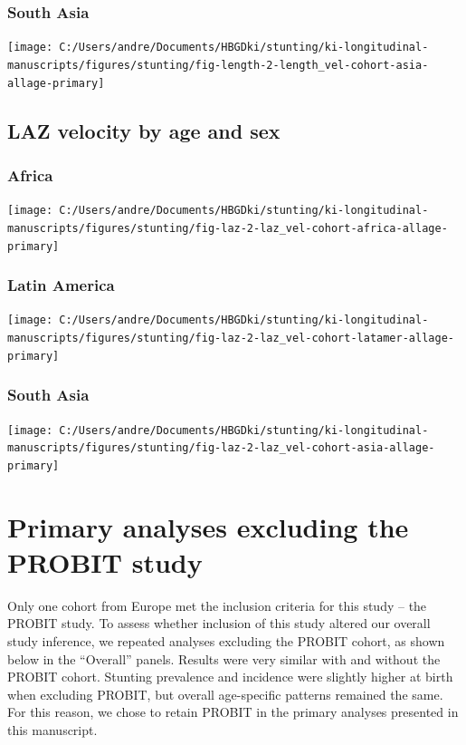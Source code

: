 \documentclass[9pt,]{book}
\begin{document}
\subsection{South Asia}\label{south-asia-3}

\texttt{[image: C:/Users/andre/Documents/HBGDki/stunting/ki-longitudinal-manuscripts/figures/stunting/fig-length-2-length\_vel-cohort-asia-allage-primary]}

\section{LAZ velocity by age and sex}\label{laz-velocity-by-age-and-sex}

\subsection{Africa}\label{africa-4}

\texttt{[image: C:/Users/andre/Documents/HBGDki/stunting/ki-longitudinal-manuscripts/figures/stunting/fig-laz-2-laz\_vel-cohort-africa-allage-primary]}

\subsection{Latin America}\label{latin-america-4}

\texttt{[image: C:/Users/andre/Documents/HBGDki/stunting/ki-longitudinal-manuscripts/figures/stunting/fig-laz-2-laz\_vel-cohort-latamer-allage-primary]}

\subsection{South Asia}\label{south-asia-4}

\texttt{[image: C:/Users/andre/Documents/HBGDki/stunting/ki-longitudinal-manuscripts/figures/stunting/fig-laz-2-laz\_vel-cohort-asia-allage-primary]}

\chapter{Primary analyses excluding the PROBIT
study}\label{exclude-PROBIT}

\raggedright

Only one cohort from Europe met the inclusion criteria for this study --
the PROBIT study. To assess whether inclusion of this study altered our
overall study inference, we repeated analyses excluding the PROBIT
cohort, as shown below in the ``Overall'' panels. Results were very
similar with and without the PROBIT cohort. Stunting prevalence and
incidence were slightly higher at birth when excluding PROBIT, but
overall age-specific patterns remained the same. For this reason, we
chose to retain PROBIT in the primary analyses presented in this
manuscript.
\end{document}
